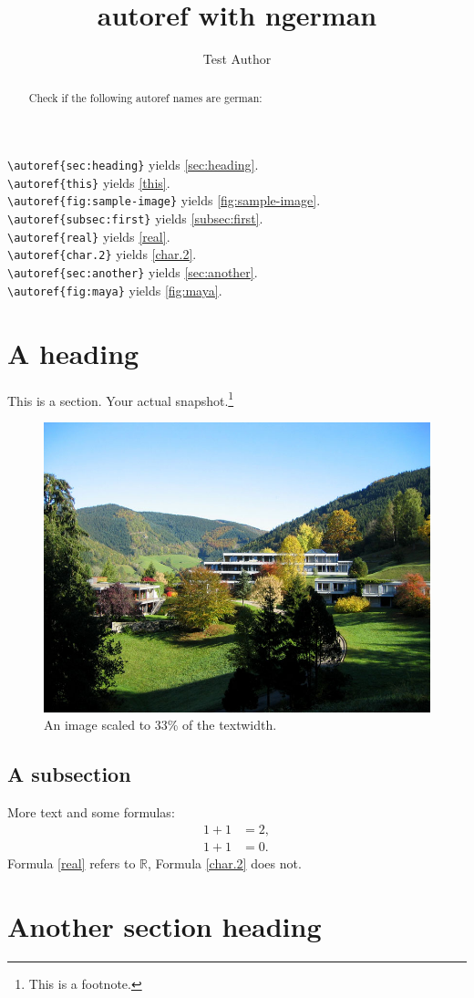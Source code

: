 \documentclass{snapshotmfo}
\author{Test Author}
\title{autoref with ngerman}
\begin{document}
\begin{abstract}
Check if the following autoref names are german:
\end{abstract}

\noindent \verb+\autoref{sec:heading}+ yields \autoref{sec:heading}.\\
\verb+\autoref{this}+ yields \autoref{this}.\\
\verb+\autoref{fig:sample-image}+ yields \autoref{fig:sample-image}.\\
\verb+\autoref{subsec:first}+ yields \autoref{subsec:first}.\\
\verb+\autoref{real}+ yields \autoref{real}.\\
\verb+\autoref{char.2}+ yields \autoref{char.2}.\\
\verb+\autoref{sec:another}+ yields \autoref{sec:another}.\\
\verb+\autoref{fig:maya}+ yields \autoref{fig:maya}.\\


\section{A heading}
\label{sec:heading}
This is a section.
Your actual snapshot.\footnote{This is a footnote.\label{this}}

\begin{figure}[ht]
        \centering 
        \includegraphics[width= 0.33 \textwidth]{mfo.jpg}
        \caption{An image scaled to 33\% of the textwidth.}
\label{fig:sample-image}
\end{figure}

\subsection{A subsection}
\label{subsec:first}
More text and some formulas:
\begin{align}\label{real}
1+1&=2,\\\label{char.2}
1+1&=0.
\end{align}
Formula \eqref{real} refers to $\mathbb{R}$, Formula \eqref{char.2} does not.


\section{Another section heading}
\label{sec:another}
\end{document}
